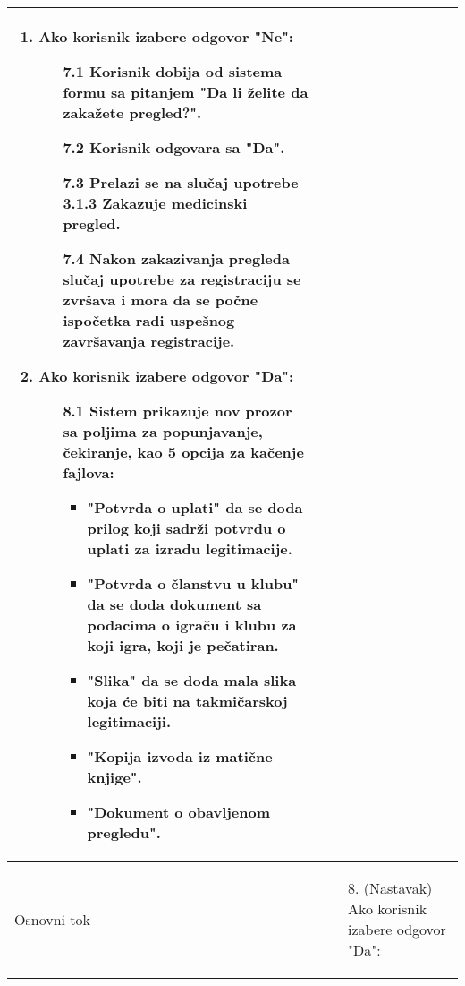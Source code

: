 \documentclass{article}
\begin{document}
\begin{longtable}{| p{} | p{} |}
\begin{enumerate}
                    \item Ako korisnik izabere odgovor "Ne":
                    \begin{enumerate}
                        \item[7.1] Korisnik dobija od sistema formu sa pitanjem "Da li želite da zakažete pregled?".
                        \item[7.2] Korisnik odgovara sa "Da".
                        \item[7.3] Prelazi se na slučaj upotrebe 3.1.3 Zakazuje medicinski pregled.
                        \item[7.4] Nakon zakazivanja pregleda slučaj upotrebe za registraciju se zvršava i mora da se počne ispočetka radi uspešnog završavanja registracije.
                    \end{enumerate}
                    \item Ako korisnik izabere odgovor "Da":
                    \begin{enumerate}
                        \item[8.1] Sistem prikazuje nov prozor sa poljima za popunjavanje, čekiranje, kao 5 opcija za kačenje fajlova:
                        \begin{itemize}
                            \item "Potvrda o uplati" da se doda prilog koji sadrži potvrdu o uplati za izradu legitimacije.
                            \item "Potvrda o članstvu u klubu" da se doda dokument sa podacima o igraču i klubu za koji igra, koji je pečatiran.
                            \item "Slika" da se doda mala slika koja će biti na takmičarskoj legitimaciji.
                            \item "Kopija izvoda iz matične knjige".
                            \item "Dokument o obavljenom pregledu".
                        \end{itemize}  
                    \end{enumerate}
                 \end{enumerate}\\
            \hline
                Osnovni tok &
                \begin{enumerate}
                    \item[8.] (Nastavak)  Ako korisnik izabere odgovor "Da":
                    \begin{enumerate}

\end{enumerate}
\end{enumerate}
\end{longtable}
\end{document}
